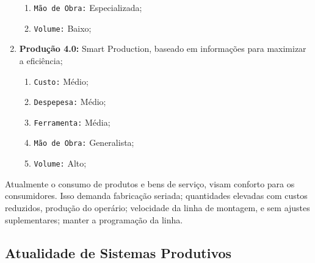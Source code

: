 \documentclass{article}
\begin{document}
\begin{enumerate}[noitemsep]
\begin{enumerate}[noitemsep]
                            \item \texttt{Mão de Obra:} Especializada;
                            \item \texttt{Volume:} Baixo;
                        \end{enumerate}
                    \item \textbf{Produção 4.0:} Smart Production, baseado em informações para maximizar a eficiência;
                        \begin{enumerate}[noitemsep]
                            \item \texttt{Custo:} Médio;
                            \item \texttt{Despepesa:} Médio;
                            \item \texttt{Ferramenta:} Média;
                            \item \texttt{Mão de Obra:} Generalista;
                            \item \texttt{Volume:} Alto;
                        \end{enumerate}
                \end{enumerate}\noindent
            Atualmente o consumo de produtos e bens de serviço, visam conforto para os consumidores. Isso demanda fabricação seriada; quantidades elevadas com custos reduzidos, produção do operário; velocidade da linha de montagem, e sem ajustes suplementares; manter a programação da linha.

        \subsection{Atualidade de Sistemas Produtivos}
\end{document}
